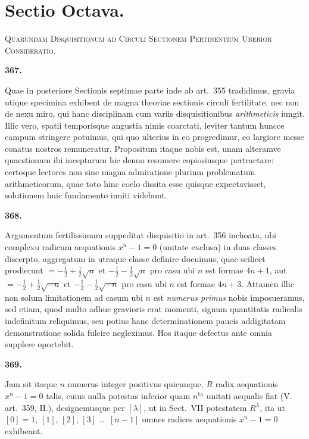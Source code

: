 \documentclass[10pt,a4paper]{article}
\begin{document}
\newpage

\section{Sectio Octava.}

\begin{center}
\Large\textsc{Quarundam Disquisitionum ad Circuli Sectionem Pertinentium Uberior Consideratio.}
\end{center}

\medskip

\textbf{367.}

Quae in posteriore Sectionis septimae parte inde ab art.~355 tradidimus, gravia utique specimina exhibent de magna theoriae sectionis circuli fertilitate, nec non de nexu miro, qui hanc disciplinam cum variis disquisitionibus \textit{arithmeticis} iungit. Illic vero, spatii temporisque angustia nimis coarctati, leviter tantum huncce campum stringere potuimus, qui quo ulterius in eo progredimur, eo largiore messe conatus nostros remuneratur. Propositum itaque nobis est, unam alteramve quaestionum ibi inceptarum hic denuo resumere copiosiusque pertractare: certoque lectores non sine magna admiratione plurium problematum arithmeticorum, quae toto hinc coelo dissita esse quisque expectavisset, solutionem huic fundamento inniti videbunt.

\medskip

\textbf{368.}

Argumentum fertilissimum suppeditat disquisitio in art.~356 inchoata, ubi complexu radicum aequationis $x^n - 1 = 0$ (unitate exclusa) in duas classes discerpto, aggregatum in utraque classe definire docuimus, quae scilicet prodierunt $= -\frac{1}{2} + \frac{1}{2}\sqrt{n}$ et $-\frac{1}{2} - \frac{1}{2}\sqrt{n}$ pro casu ubi $n$ est formae $4n+1$, aut $= -\frac{1}{2} + \frac{1}{2}\sqrt{-n}$ et $-\frac{1}{2} - \frac{1}{2}\sqrt{-n}$ pro casu ubi $n$ est formae $4n+3$. Attamen illic non solum limitationem ad casum ubi $n$ est \textit{numerus primus} nobis imposueramus, sed etiam, quod multo adhuc gravioris erat momenti, signum quantitatis radicalis indefinitum reliquimus, seu potius hanc determinationem paucis addigitatam demonstratione solida fulcire negleximus. Hos itaque defectus ante omnia supplere oportebit.

\medskip

\textbf{369.}

Jam sit itaque $n$ numerus integer positivus quicunque, $R$ radix aequationis $x^n - 1 = 0$ talis, cuius nulla potestas inferior quam $n^{\text{ta}}$ unitati aequalis fiat (V. art.~359, II.), designemusque per $[\lambda]$, ut in Sect.~VII potestatem $R^\lambda$, ita ut $[0] = 1$, $[1]$, $[2]$, $[3]$ \ldots\ $[n-1]$ omnes radices aequationis $x^n - 1 = 0$ exhibeant.
\end{document}
